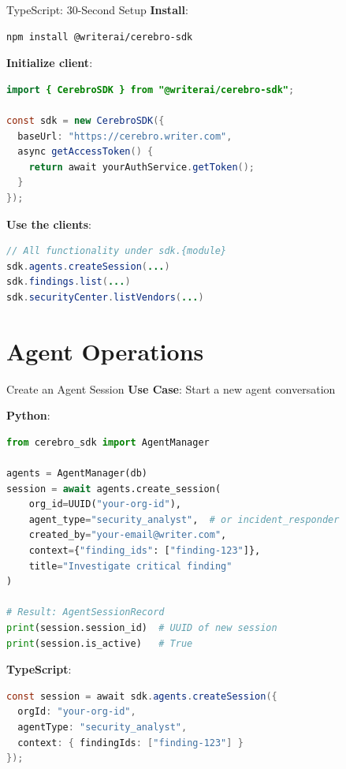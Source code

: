 \documentclass[aspectratio=169]{beamer}
\begin{document}
\begin{frame}[fragile]{TypeScript: 30-Second Setup}
\textbf{Install}:
\begin{lstlisting}[language=bash]
npm install @writerai/cerebro-sdk
\end{lstlisting}

\textbf{Initialize client}:
\begin{lstlisting}[language=Java]
import { CerebroSDK } from "@writerai/cerebro-sdk";

const sdk = new CerebroSDK({
  baseUrl: "https://cerebro.writer.com",
  async getAccessToken() {
    return await yourAuthService.getToken();
  }
});
\end{lstlisting}

\textbf{Use the clients}:
\begin{lstlisting}[language=Java]
// All functionality under sdk.{module}
sdk.agents.createSession(...)
sdk.findings.list(...)
sdk.securityCenter.listVendors(...)
\end{lstlisting}
\end{frame}

\section{Agent Operations}

\begin{frame}[fragile]{Create an Agent Session}
\textbf{Use Case}: Start a new agent conversation

\textbf{Python}:
\begin{lstlisting}[language=Python]
from cerebro_sdk import AgentManager

agents = AgentManager(db)
session = await agents.create_session(
    org_id=UUID("your-org-id"),
    agent_type="security_analyst",  # or incident_responder
    created_by="your-email@writer.com",
    context={"finding_ids": ["finding-123"]},
    title="Investigate critical finding"
)

# Result: AgentSessionRecord
print(session.session_id)  # UUID of new session
print(session.is_active)   # True
\end{lstlisting}

\textbf{TypeScript}:
\begin{lstlisting}[language=Java]
const session = await sdk.agents.createSession({
  orgId: "your-org-id",
  agentType: "security_analyst",
  context: { findingIds: ["finding-123"] }
});
\end{lstlisting}
\end{frame}
\end{document}
